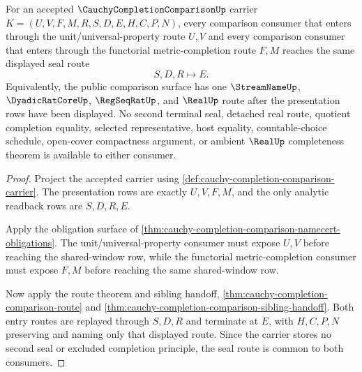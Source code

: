 \begin{theorem}
\label{thm:cauchy-completion-comparison-seal-agreement}
For an accepted $\CauchyCompletionComparisonUp$ carrier $K=(U,V,F,M,R,S,D,E,H,C,P,N)$, every comparison consumer that enters through the unit/universal-property route $U,V$ and every comparison consumer that enters through the functorial metric-completion route $F,M$ reaches the same displayed seal route
$$
S,D,R \longmapsto E .
$$
Equivalently, the public comparison surface has one $\StreamNameUp$, $\DyadicRatCoreUp$, $\RegSeqRatUp$, and $\RealUp$ route after the presentation rows have been displayed. No second terminal seal, detached real route, quotient completion equality, selected representative, host equality, countable-choice schedule, open-cover compactness argument, or ambient $\RealUp$ completeness theorem is available to either consumer.
\end{theorem}
\begin{proof}
Project the accepted carrier using \autoref{def:cauchy-completion-comparison-carrier}. The presentation rows are exactly $U,V,F,M$, and the only analytic readback rows are $S,D,R,E$.

Apply the obligation surface of \autoref{thm:cauchy-completion-comparison-namecert-obligations}. The unit/universal-property consumer must expose $U,V$ before reaching the shared-window row, while the functorial metric-completion consumer must expose $F,M$ before reaching the same shared-window row.

Now apply the route theorem and sibling handoff, \autoref{thm:cauchy-completion-comparison-route} and \autoref{thm:cauchy-completion-comparison-sibling-handoff}. Both entry routes are replayed through $S,D,R$ and terminate at $E$, with $H,C,P,N$ preserving and naming only that displayed route. Since the carrier stores no second seal or excluded completion principle, the seal route is common to both consumers.
\end{proof}

